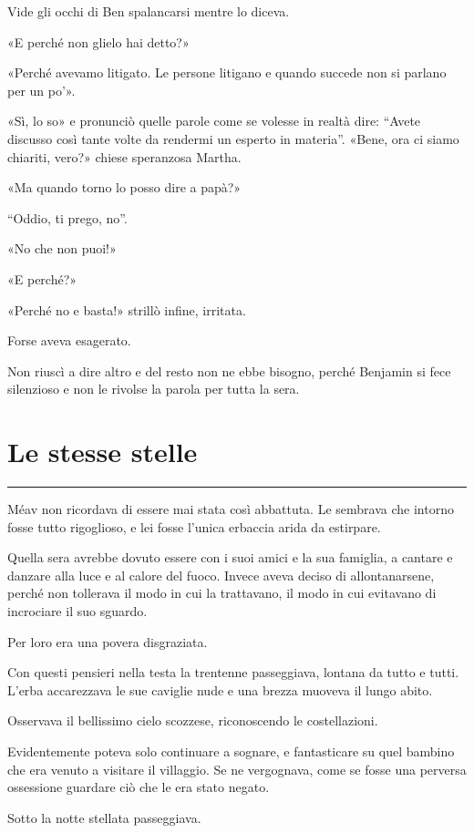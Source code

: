 \documentclass[a4paper,11pt,oneside,openright,final]{memoir}
\begin{document}
Vide gli occhi di Ben spalancarsi mentre lo diceva.

«E perché non glielo hai detto?»

«Perché avevamo litigato. Le persone litigano e quando succede non si parlano
per un po'».

«Sì, lo so» e pronunciò quelle parole come se volesse in realtà dire:
``Avete discusso così tante volte da rendermi un esperto in materia''.
«Bene, ora ci siamo chiariti, vero?» chiese speranzosa Martha.

«Ma quando torno lo posso dire a papà?»

``Oddio, ti prego, no''.

«No che non puoi!»

«E perché?»

«Perché no e basta!» strillò infine, irritata.

Forse aveva esagerato.

Non riuscì a dire altro e del resto non ne ebbe bisogno, perché Benjamin si
fece silenzioso e non le rivolse la parola per tutta la sera.

\chapter{Le stesse stelle}

\plainbreak{1}

Méav non ricordava di essere mai stata così abbattuta. Le sembrava che intorno
fosse tutto rigoglioso, e lei fosse l'unica erbaccia arida da estirpare.

Quella sera avrebbe dovuto essere con i suoi amici e la sua famiglia, a cantare
e danzare alla luce e al calore del fuoco. Invece aveva deciso di
allontanarsene, perché non tollerava il modo in cui la trattavano, il modo in
cui evitavano di incrociare il suo sguardo.

Per loro era una povera disgraziata.

Con questi pensieri nella testa la trentenne passeggiava, lontana da tutto e
tutti. L'erba accarezzava le sue caviglie nude e una brezza muoveva il lungo
abito.

Osservava il bellissimo cielo scozzese, riconoscendo le costellazioni.

Evidentemente poteva solo continuare a sognare, e fantasticare su quel bambino
che era venuto a visitare il villaggio. Se ne vergognava, come se fosse una
perversa ossessione guardare ciò che le era stato negato.

Sotto la notte stellata passeggiava.
\end{document}
